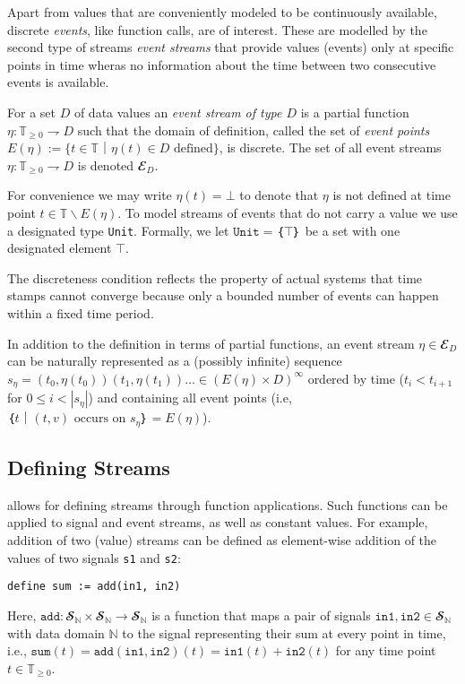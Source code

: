 Apart from values that are conveniently modeled to be continuously available, discrete \emph{events}, like function calls, are of interest.
These are modelled by the second type of streams \emph{event streams} that provide values (events) only at specific points in time wheras no information about the time between two consecutive events is available.

\begin{definition}
  For a set $D$ of data values an \emph{event stream of type $D$} is a partial function $η: 𝕋_{≥0} ⇁ D$ such that the domain of definition, called the set of \emph{event points} $E(η) := \{t∈𝕋｜η(t)∈D \text{ defined}\}$, is discrete.
%
  The set of all event streams $η: 𝕋_{≥0} ⇁D$ is denoted $𝓔_D$.
\end{definition}

For convenience we may write $η(t) = ⊥$ to denote that $η$ is not defined at time point $t∈𝕋∖ E(η)$.
To model streams of events that do not carry a value we use a designated type \texttt{Unit}.
Formally, we let $\mathtt{Unit}=｛⊤｝$ be a set with one designated element $⊤$.

The discreteness condition reflects the property of actual systems that time stamps cannot converge because only a bounded number of events can happen within a fixed time period.

In addition to the definition in terms of partial functions, an event stream $η∈𝓔_D$ can be naturally represented as a (possibly infinite) sequence $s_η=(t_0,η(t_0))(t_1,η(t_1))…∈(E(η)×D)^∞$ ordered by time ($t_i<t_{i+1}$ for $0≤i<|s_η|$) and containing all event points (i.e, $｛t｜(t,v) \text{ occurs on } s_η｝= E(η)$).

\subsection{Defining Streams}

\tessla allows for defining streams through function applications.
Such functions can be applied to signal and event streams, as well as constant values.
For example, addition of two (value) streams can be defined as element-wise addition of the values of two signals \texttt{s1} and \texttt{s2}:
\begin{lstlisting}[language=tessla]
  define sum := add(in1, in2)
\end{lstlisting}
Here, $\mathtt{add}: 𝓢_ℕ × 𝓢_ℕ → 𝓢_ℕ$ is a function that maps a pair of signals $\mathtt{in1},\mathtt{in2}∈𝓢_ℕ$ with data domain $ℕ$ to the signal representing their sum at every point in time, i.e.,  $\mathtt{sum}(t) = \mathtt{add}(\mathtt{in1}, \mathtt{in2})(t) = \mathtt{in1}(t) + \mathtt{in2}(t)$ for any time point $t∈𝕋_{\geq 0}$.


